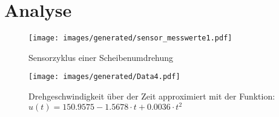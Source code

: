 \chapter{Analyse}




\begin{figure}[hb] \centering
	\texttt{[image: images/generated/sensor\_messwerte1.pdf]}
	\caption{Sensorzyklus einer Scheibenumdrehung}
\end{figure}

\begin{figure}[hb] \centering
	\texttt{[image: images/generated/Data4.pdf]}
	\caption{Drehgeschwindigkeit über der Zeit approximiert mit der Funktion: \newline $u(t) = 150.9575 - 1.5678\cdot t + 0.0036 \cdot t^2$}
\end{figure}

